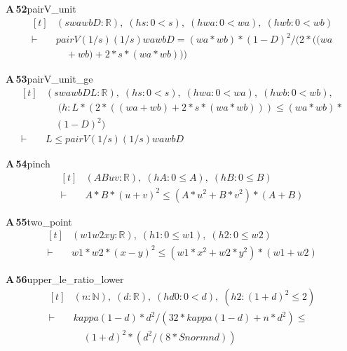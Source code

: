 \documentclass[conference]{IEEEtran}
\theoremstyle{definition}
\newcommand{\lean}[1]{\textsf{\footnotesize #1}}
\begin{document}
\noindent\textbf{A\,52}\quad\lean{pairV\_unit}
{\footnotesize\[ \begin{aligned}[t]
&(\mathit{s} \mathit{wa} \mathit{wb} \mathit{D} : \mathbb{R} ),\; (\mathit{hs} : 0 < \mathit{s}),\; (\mathit{hwa} : 0 < \mathit{wa}),\; (\mathit{hwb} : 0 < \mathit{wb})\\
\vdash\;&\mathit{pairV} (1/\mathit{s}) (1/\mathit{s}) \mathit{wa} \mathit{wb} \mathit{D} = (\mathit{wa}*\mathit{wb})*(1-\mathit{D})^{2}/(2*((\mathit{wa}\\
&\quad +\mathit{wb}) + 2*\mathit{s}*(\mathit{wa}*\mathit{wb})))
\end{aligned} \]}

\noindent\textbf{A\,53}\quad\lean{pairV\_unit\_ge}
{\footnotesize\[ \begin{aligned}[t]
&(\mathit{s} \mathit{wa} \mathit{wb} \mathit{D} \mathit{L} : \mathbb{R} ),\; (\mathit{hs} : 0 < \mathit{s}),\; (\mathit{hwa} : 0 < \mathit{wa}),\; (\mathit{hwb} : 0 < \mathit{wb}),\\
&\quad \; (\mathit{h} : \mathit{L}*(2*((\mathit{wa}+\mathit{wb}) + 2*\mathit{s}*(\mathit{wa}*\mathit{wb}))) \leq (\mathit{wa}*\mathit{wb})*\\
&\quad (1-\mathit{D})^{2})\\
\vdash\;&\mathit{L} \leq \mathit{pairV} (1/\mathit{s}) (1/\mathit{s}) \mathit{wa} \mathit{wb} \mathit{D}
\end{aligned} \]}

\noindent\textbf{A\,54}\quad\lean{pinch}
{\footnotesize\[ \begin{aligned}[t]
&(\mathit{A} \mathit{B} \mathit{u} \mathit{v} : \mathbb{R} ),\; (\mathit{hA} : 0 \leq \mathit{A}),\; (\mathit{hB} : 0 \leq \mathit{B})\\
\vdash\;&\mathit{A}*\mathit{B}*(\mathit{u}+\mathit{v})^{2} \leq (\mathit{A}*\mathit{u}^{2} + \mathit{B}*\mathit{v}^{2})*(\mathit{A}+\mathit{B})
\end{aligned} \]}

\noindent\textbf{A\,55}\quad\lean{two\_point}
{\footnotesize\[ \begin{aligned}[t]
&(\mathit{w1} \mathit{w2} \mathit{x} \mathit{y} : \mathbb{R} ),\; (\mathit{h1} : 0 \leq \mathit{w1}),\; (\mathit{h2} : 0 \leq \mathit{w2})\\
\vdash\;&\mathit{w1}*\mathit{w2}*(\mathit{x}-\mathit{y})^{2} \leq (\mathit{w1}*\mathit{x}^{2} + \mathit{w2}*\mathit{y}^{2})*(\mathit{w1}+\mathit{w2})
\end{aligned} \]}

\noindent\textbf{A\,56}\quad\lean{upper\_le\_ratio\_lower}
{\footnotesize\[ \begin{aligned}[t]
&(\mathit{n} : \mathbb{N} ),\; (\mathit{d} : \mathbb{R} ),\; (\mathit{hd0} : 0 < \mathit{d}),\; (\mathit{h2} : (1+\mathit{d})^{2} \leq 2)\\
\vdash\;&\mathit{kappa} (1-\mathit{d})*\mathit{d}^{2}/(32*\mathit{kappa} (1-\mathit{d}) + \mathit{n}*\mathit{d}^{2}) \leq\\
&\quad (1+\mathit{d})^{2}*(\mathit{d}^{2}/(8*\mathit{Snorm} \mathit{n} \mathit{d}))
\end{aligned} \]}
\end{document}

